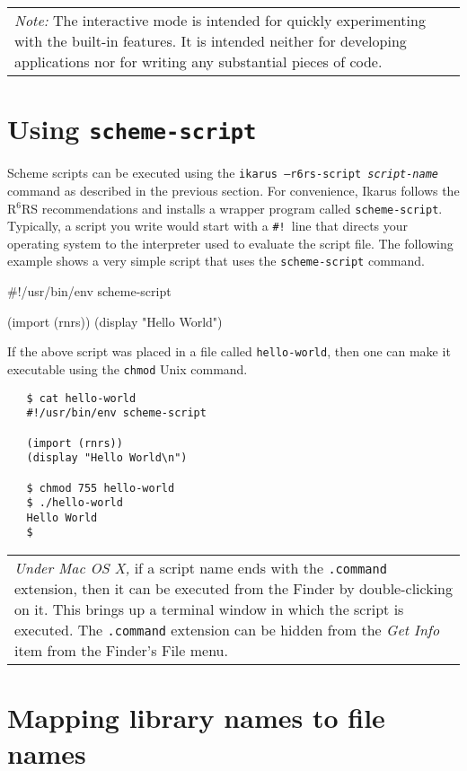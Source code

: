 \documentclass[onecolumn, 12pt, twoside, openright, dvipdfm]{book}
\newcommand{\rnrs}[1]{R$^{\mathrm{#1}}$RS}
\newcommand{\BoxedText}[2]{
  \vspace{.05in}
  \begin{center}
    \begin{tabular}{|p{4.6in}|} {\large \emph{#1}} #2 \end{tabular}
  \end{center}
  \vspace{.05in}
}
\begin{document}
\begin{itemize}
\BoxedText{Note:}{The interactive mode is intended for quickly
experimenting with the built-in features.  It is intended neither
for developing applications nor for writing any substantial pieces
of code.}

\end{itemize}

\section{Using \texttt{scheme-script}}

Scheme scripts can be executed using the
\texttt{ikarus~--r6rs-script~\textit{script-name}} command as
described in the previous section.  For convenience, Ikarus
follows the \rnrs{6} recommendations and installs a wrapper program
called \texttt{scheme-script}.  Typically, a script you write would
start with a \texttt{\#!}\ line that directs your operating system
to the interpreter used to evaluate the script file.  The following
example shows a very simple script that uses the
\texttt{scheme-script} command.

\begin{CodeInline}
#!/usr/bin/env scheme-script

(import (rnrs))
(display "Hello World\n")
\end{CodeInline}

If the above script was placed in a file called
\texttt{hello-world}, then one can make it executable using the
\texttt{chmod} Unix command.

\begin{verbatim}
   $ cat hello-world
   #!/usr/bin/env scheme-script
   
   (import (rnrs))
   (display "Hello World\n")
   
   $ chmod 755 hello-world
   $ ./hello-world
   Hello World
   $
\end{verbatim}

\BoxedText{Under Mac OS X,}{if a script name ends with the
\texttt{.command} extension, then it can be executed from the Finder
by double-clicking on it.  This brings up a terminal window in which
the script is executed.  The \texttt{.command} extension can be
hidden from the \emph{Get Info} item from the Finder's File menu.}


\section{Mapping library names to file names}
\end{document}
